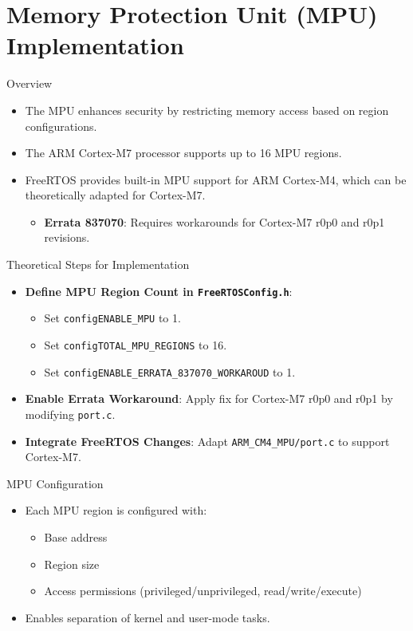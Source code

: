 
\section{Memory Protection Unit (MPU) Implementation}

\begin{frame}{Overview}
    \begin{itemize}
        \item The MPU enhances security by restricting memory access based on region configurations.
        \item The ARM Cortex-M7 processor supports up to 16 MPU regions.
        \item FreeRTOS provides built-in MPU support for ARM Cortex-M4, which can be theoretically adapted for Cortex-M7.
        \begin{itemize}
            \item \textbf{Errata 837070}: Requires workarounds for Cortex-M7 r0p0 and r0p1 revisions. 
        \end{itemize}
    \end{itemize}
\end{frame}

\begin{frame}{Theoretical Steps for Implementation}
    \begin{itemize}
        \item \textbf{Define MPU Region Count in \texttt{FreeRTOSConfig.h}}:
            \begin{itemize}
                \item Set \texttt{configENABLE\_MPU} to 1.
                \item Set \texttt{configTOTAL\_MPU\_REGIONS} to 16.
                \item Set \texttt{configENABLE\_ERRATA\_837070\_WORKAROUD} to 1.
            \end{itemize}
        \item \textbf{Enable Errata Workaround}: Apply fix for Cortex-M7 r0p0 and r0p1 by modifying \texttt{port.c}.
        \item \textbf{Integrate FreeRTOS Changes}: Adapt \texttt{ARM\_CM4\_MPU/port.c} to support Cortex-M7.
    \end{itemize}
\end{frame}

\begin{frame}{MPU Configuration}
    \begin{itemize}
        \item Each MPU region is configured with:
        \begin{itemize}
            \item Base address
            \item Region size
            \item Access permissions (privileged/unprivileged, read/write/execute)
        \end{itemize}
        \item Enables separation of kernel and user-mode tasks.
    \end{itemize}
\end{frame}

